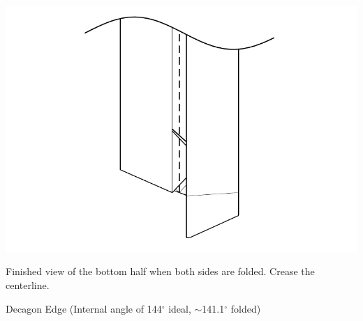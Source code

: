 \documentclass[11pt]{article}
\begin{document}
\vspace*{0.5in}

\begin{minipage}[t]{0.45\textwidth}
  \includegraphics[width=\textwidth]{../figs/fig08-08}
  \begin{itemize}{\item[8.] Finished view of the bottom half when both sides are folded.  Crease the centerline.}\end{itemize}
\end{minipage}

\newpage
{\Large Decagon Edge} (Internal angle of 144$^\circ$ ideal, $\sim$141.1$^\circ$ folded)
\vspace*{0.25in}
\end{document}
